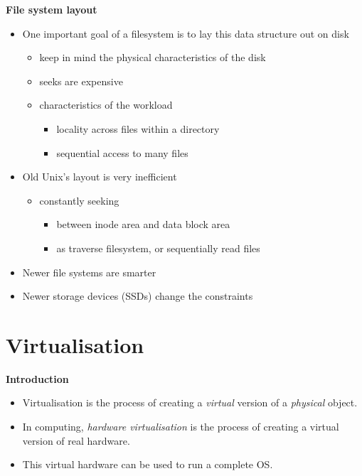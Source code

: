 \documentclass[11pt,a4paper]{article}
\begin{document}
\textbf{File system layout}
\begin{itemize}
    \item One important goal of a filesystem is to lay this data structure out on disk
        \begin{itemize}
            \item keep in mind the physical characteristics of the disk
            \item seeks are expensive
            \item characteristics of the workload
                \begin{itemize}
                    \item locality across files within a directory
                    \item sequential access to many files
                \end{itemize}
        \end{itemize}
    \item Old Unix's layout is very inefficient
        \begin{itemize}
            \item constantly seeking
                \begin{itemize}
                    \item between inode area and data block area
                    \item as traverse filesystem, or sequentially read files
                \end{itemize}
        \end{itemize}
    \item Newer file systems are smarter
    \item Newer storage devices (SSDs) change the constraints
\end{itemize}

\break{}

\section{Virtualisation}

\textbf{Introduction}
\begin{itemize}
    \item Virtualisation is the process of creating a \emph{virtual} version of a \emph{physical}
        object.
    \item In computing, \emph{hardware virtualisation} is the process of creating a virtual
        version of real hardware.
    \item This virtual hardware can be used to run a complete OS.\
\end{itemize}
\end{document}
